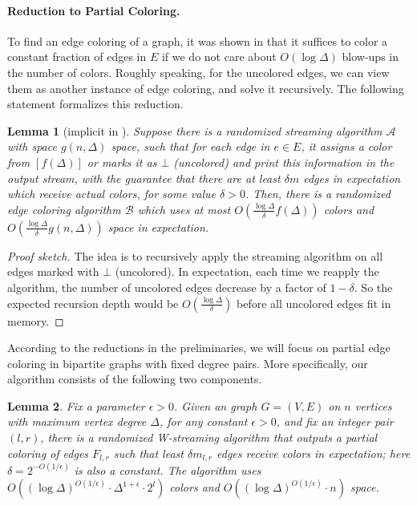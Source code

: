 \documentclass[11pt,a4paper]{article}
\newtheorem{lemma}{Lemma}[section]
\newcommand{\brac}[1]{\left(#1\right)}
\begin{document}
\paragraph*{Reduction to Partial Coloring.} To find an edge coloring of a graph, it was shown in \cite{chechik_et_al:LIPIcs.ICALP.2024.40} that it suffices to color a constant fraction of edges in $E$ if we do not care about $O(\log\Delta)$ blow-ups in the number of colors. Roughly speaking, for the uncolored edges, we can view them as another instance of edge coloring, and solve it recursively. The following statement formalizes this reduction.
\begin{lemma}[implicit in \cite{chechik_et_al:LIPIcs.ICALP.2024.40}]
	Suppose there is a randomized streaming algorithm $\mathcal{A}$ with space $g(n, \Delta)$ space, such that for each edge in $e\in E$, it assigns a color from $[f(\Delta)]$ or marks it as $\bot$ (uncolored) and print this information in the output stream, with the guarantee that there are at least $\delta m$ edges in expectation which receive actual colors, for some value $\delta > 0$. Then, there is a randomized edge coloring algorithm $\mathcal{B}$ which uses at most $O\brac{\frac{\log\Delta}{\delta}f(\Delta)}$ colors and $O\brac{\frac{\log\Delta}{\delta}g(n, \Delta)}$ space in expectation.
\end{lemma}
\begin{proof}[Proof sketch]
    The idea is to recursively apply the streaming algorithm on all edges marked with $\bot$ (uncolored). In expectation, each time we reapply the algorithm, the number of uncolored edges decrease by a factor of $1-\delta$. So the expected recursion depth would be $O(\frac{\log\Delta}{\delta})$ before all uncolored edges fit in memory.
\end{proof}



According to the reductions in the preliminaries, we will focus on partial edge coloring in bipartite graphs with fixed degree pairs. More specifically, our algorithm consists of the following two components.

\begin{lemma}\label{low}
	Fix a parameter $\epsilon > 0$. Given an graph $G = (V, E)$ on $n$ vertices with maximum vertex degree $\Delta$, for any constant $\epsilon > 0$, and fix an integer pair $(l, r)$, there is a randomized W-streaming algorithm that outputs a partial coloring of edges $F_{l, r}$ such that least $\delta m_{l, r}$ edges receive colors in expectation; here $\delta = 2^{-O(1/\epsilon)}$ is also a constant. The algorithm uses $O\brac{(\log\Delta)^{O(1 / \epsilon)}\cdot \Delta^{1+\epsilon}\cdot 2^l}$ colors and $O\brac{(\log\Delta)^{O(1 / \epsilon)}\cdot n}$ space.
\end{lemma}
\end{document}

